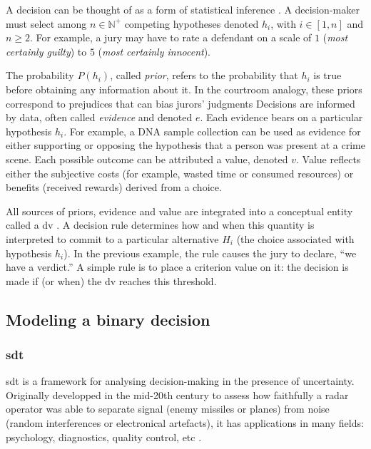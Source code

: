 A decision can be thought of as a form of statistical inference \cite{goldNeuralBasisDecision2007}. A decision-maker must select among $n \in \mathbb{N^{+}}$ competing hypotheses denoted $h_i$, with $i \in [1,n]$ and $n \ge 2$. For example, a jury may have to rate a defendant on a scale of $1$ (\textit{most certainly guilty}) to $5$ (\textit{most certainly innocent}).

The probability $P(h_i)$, called \textit{prior}, refers to the probability that $h_i$ is true before obtaining any information about it. In the courtroom analogy, these priors correspond to prejudices that can bias jurors’ judgments Decisions are informed by data, often called \textit{evidence} and denoted $e$. Each evidence bears on a particular hypothesis $h_i$. For example, a DNA sample collection can be used as evidence for either supporting or opposing the hypothesis that a person was present at a crime scene. Each possible outcome can be attributed a value, denoted $v$. Value reflects either the subjective costs (for example, wasted time or consumed resources) or benefits (received rewards) derived from a choice.

All sources of priors, evidence and value are integrated into a conceptual entity called a \acrfull{dv} \cite{goldNeuralBasisDecision2007}. A decision rule determines how and when this quantity is interpreted to commit to a particular alternative $H_i$ (the choice associated with hypothesis $h_i$). In the previous example, the rule causes the jury to declare, “we have a verdict.” A simple rule is to place a criterion value on it: the decision is made if (or when) the \acrshort{dv} reaches this threshold.

\subsection{Modeling a binary decision}

\subsubsection{\acrlong{sdt}}

\acrfull{sdt} is a framework for analysing \gls{decision-making} in the presence of uncertainty. Originally developped in the mid-20th century to assess how faithfully a radar operator was able to separate signal (enemy missiles or planes) from noise (random interferences or electronical artefacts), it has applications in many fields: psychology, diagnostics, quality control, etc \cite{green1966signal}.

